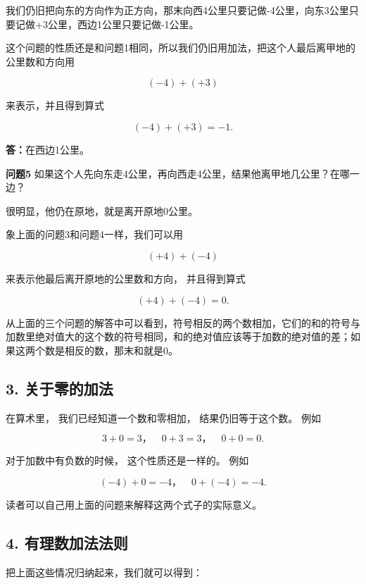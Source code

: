 我们仍旧把向东的方向作为正方向，那末向西4公里只要记做-4公里，向东3公里只要记做+3公里，西边1公里只要记做-1公里。

这个问题的性质还是和问题1相同，所以我们仍旧用加法，把这个人最后离甲地的公里数和方向用

\[
(- 4) + (+ 3)
\]

来表示，并且得到算式

\[
(- 4) + (+ 3) = - 1.
\]

\textbf{答：}在西边1公里。

\textbf{问题5}
如果这个人先向东走4公里，再向西走4公里，结果他离甲地几公里？在哪一边？

 很明显，他仍在原地，就是离开原地0公里。

象上面的问题3和问题4一样，我们可以用

\[
(+ 4) + (- 4)
\]

来表示他最后离开原地的公里数和方向， 并且得到算式

\[
(+ 4) + (- 4) = 0.
\]

从上面的三个问题的解答中可以看到，符号相反的两个数相加，它们的和的符号与加数里绝对值大的这个数的符号相同，和的绝对值应该等于加数的绝对值的差；如果这两个数是相反的数，那末和就是0。

\subsection{3. 关于零的加法}

在算术里， 我们已经知道一个数和零相加， 结果仍旧等于这个数。 例如

\[
3 + 0 = 3\text{，} \quad 0 + 3 = 3\text{，} \quad 0 + 0 = 0.
\]

对于加数中有负数的时候， 这个性质还是一样的。 例如

\[
(- 4) + 0 = - 4\text{，} \quad 0 + (- 4) = - 4.
\]

读者可以自己用上面的问题来解释这两个式子的实际意义。

\subsection{4. 有理数加法法则}

把上面这些情况归纳起来，我们就可以得到：


